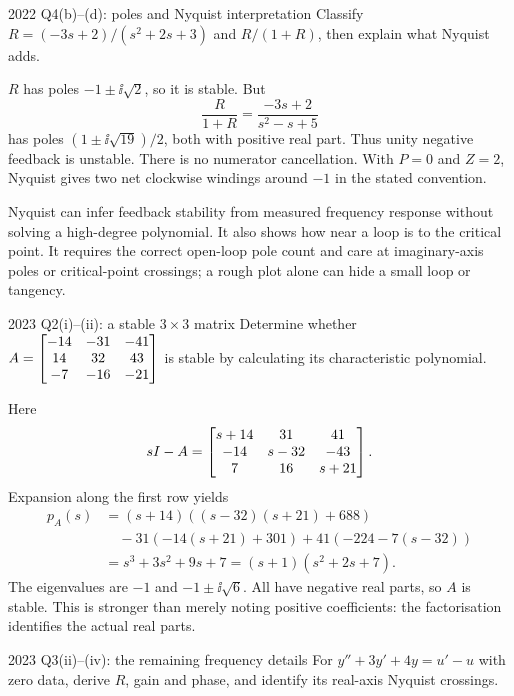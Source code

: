 \begin{question}{2022 Q4(b)--(d): poles and Nyquist interpretation}
Classify $R=(-3s+2)/(s^2+2s+3)$ and $R/(1+R)$, then explain what Nyquist adds.
\end{question}
\begin{answer}
$R$ has poles $-1\pm\ii\sqrt2$, so it is stable. But
\[\frac R{1+R}=\frac{-3s+2}{s^2-s+5}\]
has poles $(1\pm\ii\sqrt{19})/2$, both with positive real part. Thus unity negative feedback is unstable. There is no numerator cancellation. With $P=0$ and $Z=2$, Nyquist gives two net clockwise windings around $-1$ in the stated convention.

Nyquist can infer feedback stability from measured frequency response without solving a high-degree polynomial. It also shows how near a loop is to the critical point. It requires the correct open-loop pole count and care at imaginary-axis poles or critical-point crossings; a rough plot alone can hide a small loop or tangency.
\end{answer}
\begin{question}{2023 Q2(i)--(ii): a stable $3\times3$ matrix}
Determine whether $A=\begin{bmatrix}-14&-31&-41\\14&32&43\\-7&-16&-21\end{bmatrix}$ is stable by calculating its characteristic polynomial.
\end{question}
\begin{answer}
Here
\[sI-A=\begin{bmatrix}s+14&31&41\\-14&s-32&-43\\7&16&s+21\end{bmatrix}.\]
Expansion along the first row yields
\begin{align*}
p_A(s)&=(s+14)((s-32)(s+21)+688)\\
&\quad-31(-14(s+21)+301)+41(-224-7(s-32))\\
&=s^3+3s^2+9s+7=(s+1)(s^2+2s+7).
\end{align*}
The eigenvalues are $-1$ and $-1\pm\ii\sqrt6$. All have negative real parts, so $A$ is stable. This is stronger than merely noting positive coefficients: the factorisation identifies the actual real parts.
\end{answer}
\begin{question}{2023 Q3(ii)--(iv): the remaining frequency details}
For $y''+3y'+4y=u'-u$ with zero data, derive $R$, gain and phase, and identify its real-axis Nyquist crossings.
\end{question}
